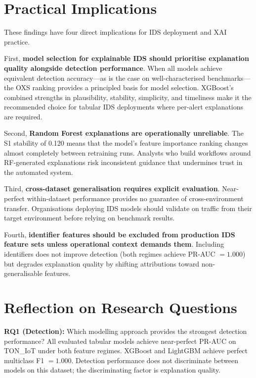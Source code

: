 \documentclass[12pt,a4paper]{report}
\begin{document}
\section{Practical Implications}
\label{sec:practical}

These findings have four direct implications for IDS deployment and XAI practice.

First, \textbf{model selection for explainable IDS should prioritise explanation quality alongside detection performance}. When all models achieve equivalent detection accuracy---as is the case on well-characterised benchmarks---the OXS ranking provides a principled basis for model selection. XGBoost's combined strengths in plausibility, stability, simplicity, and timeliness make it the recommended choice for tabular IDS deployments where per-alert explanations are required.

Second, \textbf{Random Forest explanations are operationally unreliable}. The S1 stability of 0.120 means that the model's feature importance ranking changes almost completely between retraining runs. Analysts who build workflows around RF-generated explanations risk inconsistent guidance that undermines trust in the automated system.

Third, \textbf{cross-dataset generalisation requires explicit evaluation}. Near-perfect within-dataset performance provides no guarantee of cross-environment transfer. Organisations deploying IDS models should validate on traffic from their target environment before relying on benchmark results.

Fourth, \textbf{identifier features should be excluded from production IDS feature sets unless operational context demands them}. Including identifiers does not improve detection (both regimes achieve PR-AUC $= 1.000$) but degrades explanation quality by shifting attributions toward non-generalisable features.

\section{Reflection on Research Questions}
\label{sec:rq-reflection}

\textbf{RQ1 (Detection):} Which modelling approach provides the strongest detection performance? All evaluated tabular models achieve near-perfect PR-AUC on TON\_IoT under both feature regimes. XGBoost and LightGBM achieve perfect multiclass F1 $= 1.000$. Detection performance does not discriminate between models on this dataset; the discriminating factor is explanation quality.
\end{document}

